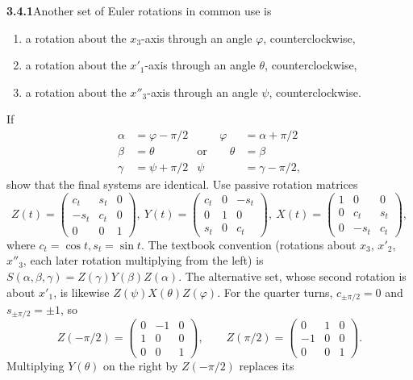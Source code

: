 \par\bigskip
\noindent\textbf{3.4.1}\quad Another set of Euler rotations in common use is
\begin{enumerate}
\item[(1)] a rotation about the $x_{3}$-axis through an angle $\varphi$,
  counterclockwise,
\item[(2)] a rotation about the $x'_{1}$-axis through an angle $\theta$,
  counterclockwise,
\item[(3)] a rotation about the $x''_{3}$-axis through an angle $\psi$,
  counterclockwise.
\end{enumerate}
If
\[
\begin{alignedat}{3}
\alpha&=\varphi-\pi/2&\qquad\varphi&=\alpha+\pi/2\\
\beta&=\theta&\text{or}\qquad\theta&=\beta\\
\gamma&=\psi+\pi/2&\psi&=\gamma-\pi/2,
\end{alignedat}
\]
show that the final systems are identical.
\solution
Use passive rotation matrices
\[
Z(t)=\begin{pmatrix}c_t&s_t&0\\-s_t&c_t&0\\0&0&1\end{pmatrix},\
Y(t)=\begin{pmatrix}c_t&0&-s_t\\0&1&0\\s_t&0&c_t\end{pmatrix},\
X(t)=\begin{pmatrix}1&0&0\\0&c_t&s_t\\0&-s_t&c_t\end{pmatrix},
\]
where $c_t=\cos t,s_t=\sin t$.
The textbook convention (rotations about $x_3$, $x'_2$, $x''_3$, each
later rotation multiplying from the left) is
$S(\alpha,\beta,\gamma)=Z(\gamma)Y(\beta)Z(\alpha)$.
The alternative set, whose second rotation is about $x'_1$, is likewise
$Z(\psi)X(\theta)Z(\varphi)$.
For the quarter turns, $c_{\pm\pi/2}=0$ and $s_{\pm\pi/2}=\pm1$, so
\[
Z(-\pi/2)=\begin{pmatrix}0&-1&0\\1&0&0\\0&0&1\end{pmatrix},\qquad
Z(\pi/2)=\begin{pmatrix}0&1&0\\-1&0&0\\0&0&1\end{pmatrix}.
\]
Multiplying $Y(\theta)$ on the right by $Z(-\pi/2)$ replaces its
